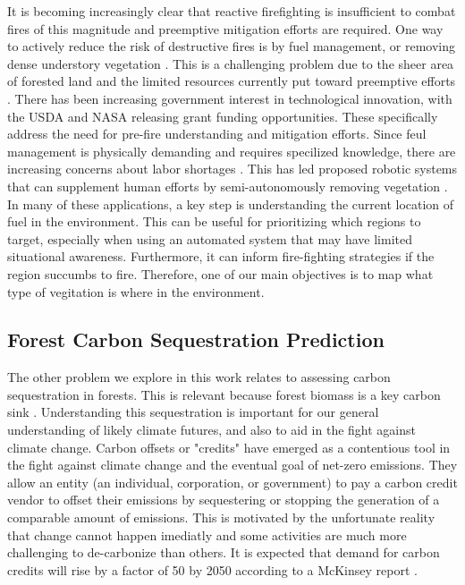 It is becoming increasingly clear that reactive firefighting is insufficient to combat fires of this magnitude and preemptive mitigation efforts are required. One way to actively reduce the risk of destructive fires is by fuel management, or removing dense understory vegetation \cite{Fire2021FuelsManagement, WildlandFireResiliencyProgram20214Plan, Agriculture2019HazardousComplex}. This is a challenging problem due to the sheer area of forested land and the limited resources currently put toward preemptive efforts \cite{spreading_like_wildfire}.
There has been increasing government interest in technological innovation, with the USDA \cite{USDA2023USDAGrant} and NASA \cite{SPSO2023Research2023} releasing grant funding opportunities. These specifically address the need for pre-fire understanding and mitigation efforts. 
Since feul management is physically demanding and requires specilized knowledge, there are increasing concerns about labor shortages \cite{CommisionGlobalDivision}. This has led proposed robotic systems that can supplement human efforts by semi-autonomously removing vegetation \cite{couceiro2019semfire}. In many of these applications, a key step is understanding the current location of fuel in the environment. This can be useful for prioritizing which regions to target, especially when using an automated system that may have limited situational awareness. Furthermore, it can inform fire-fighting strategies if the region succumbs to fire. Therefore, one of our main objectives is to map what type of vegitation is where in the environment.

\subsection{Forest Carbon Sequestration Prediction}
The other problem we explore in this work relates to assessing carbon sequestration in forests. This is relevant because forest biomass is a key carbon sink \cite{Griscom2017NaturalSolutions}. Understanding this sequestration is important for our general understanding of likely climate futures, and also to aid in the fight against climate change. Carbon offsets or "credits" have emerged as a contentious tool in the fight against climate change and the eventual goal of net-zero emissions. They allow an entity (an individual, corporation, or government) to pay a carbon credit vendor to offset their emissions by sequestering or stopping the generation of a comparable amount of emissions. This is motivated by the unfortunate reality that change cannot happen imediatly and some activities are much more challenging to de-carbonize than others. It is expected that demand for carbon credits will rise by a factor of 50 by 2050 according to a McKinsey report \cite{Blaufelder2021AChallenge}. 

